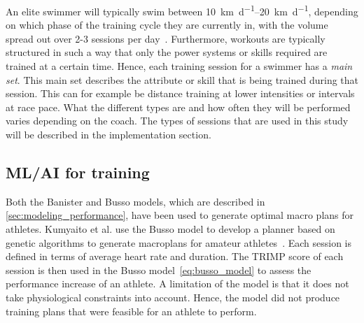 







An elite swimmer will typically swim between \SIrange{10}{20}{\kilo\meter\per\day}, depending on which phase of the training cycle they are currently in, with the volume spread out over 2-3 sessions per day~\cite{chatard1999training, mujika1995effects}.
Furthermore, workouts are typically structured in such a way that only the power systems or skills required are trained at a certain time. 
Hence, each training session for a swimmer has a \textit{main set}.
This main set describes the attribute or skill that is being trained during that session.
This can for example be distance training at lower intensities or intervals at race pace.
What the different types are and how often they will be performed varies depending on the coach.
The types of sessions that are used in this study will be described in the implementation section.

\subsection{ML/AI for training}
Both the Banister and Busso models, which are described in \cref{sec:modeling_performance}, have been used to generate optimal macro plans for athletes. 
Kumyaito et al. use the Busso model to develop a planner based on genetic algorithms to generate macroplans for amateur athletes~\cite{kumyaito2016intelligence}. 
Each session is defined in terms of average heart rate and duration.
The TRIMP score of each session is then used in the Busso model~\cref{eq:busso_model} to assess the performance increase of an athlete.
A limitation of the model is that it does not take physiological constraints into account. 
Hence, the model did not produce training plans that were feasible for an athlete to perform.

